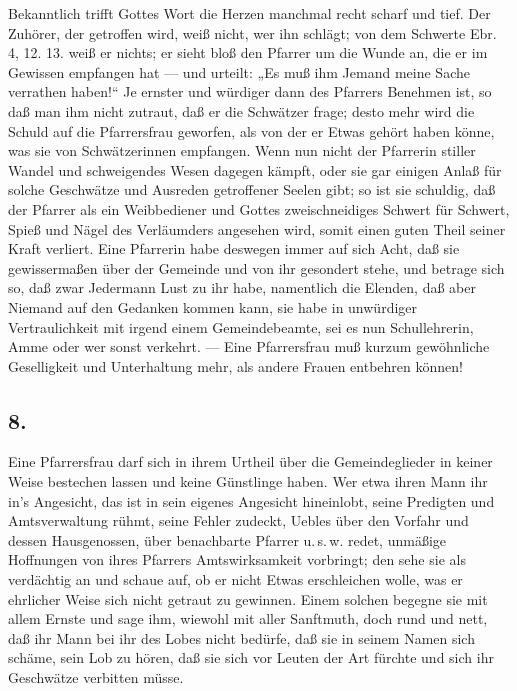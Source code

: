Bekanntlich trifft Gottes Wort die Herzen manchmal recht scharf und tief. Der Zuhörer, der getroffen wird, weiß nicht, wer ihn schlägt; von dem Schwerte Ebr. 4, 12. 13. weiß er nichts; er sieht bloß den Pfarrer um die Wunde an, die er im Gewissen empfangen hat — und urteilt: „Es muß ihm Jemand meine Sache verrathen haben!“ Je ernster und würdiger dann des Pfarrers Benehmen ist, so daß man ihm nicht zutraut, daß er die Schwätzer frage; desto mehr wird die Schuld auf die Pfarrersfrau geworfen, als von der er Etwas gehört haben könne, was sie von Schwätzerinnen empfangen. Wenn nun nicht der Pfarrerin stiller Wandel und schweigendes Wesen dagegen kämpft, oder sie gar einigen Anlaß für solche Geschwätze und Ausreden getroffener Seelen gibt; so ist sie schuldig, daß der Pfarrer als ein Weibbediener und Gottes zweischneidiges
Schwert für Schwert, Spieß und Nägel des Verläumders angesehen wird, somit einen guten Theil seiner Kraft verliert. Eine Pfarrerin habe deswegen immer auf sich Acht, daß sie gewissermaßen über der Gemeinde und von ihr gesondert stehe, und betrage sich so, daß zwar Jedermann Lust zu ihr habe, namentlich die Elenden, daß aber Niemand auf den Gedanken kommen kann, sie habe in unwürdiger Vertraulichkeit mit irgend einem Gemeindebeamte, sei es nun Schullehrerin, Amme oder wer sonst verkehrt. — Eine Pfarrersfrau muß kurzum gewöhnliche Geselligkeit und Unterhaltung mehr, als andere Frauen entbehren können!

\subsection{8.}

Eine Pfarrersfrau darf sich in ihrem Urtheil über die Gemeindeglieder in keiner Weise bestechen lassen und keine Günstlinge haben. Wer etwa ihren Mann ihr in’s Angesicht, das ist in sein eigenes Angesicht hineinlobt, seine Predigten und Amtsverwaltung rühmt, seine Fehler zudeckt, Uebles über den Vorfahr und dessen Hausgenossen, über benachbarte Pfarrer u.\,s.\,w. redet, unmäßige Hoffnungen von ihres Pfarrers Amtswirksamkeit vorbringt; den sehe sie als verdächtig an und schaue auf, ob er nicht Etwas erschleichen wolle, was er ehrlicher Weise sich nicht getraut zu gewinnen. Einem solchen begegne sie mit allem Ernste und sage ihm, wiewohl mit aller Sanftmuth, doch rund und nett, daß ihr Mann bei ihr des Lobes nicht bedürfe, daß sie in seinem Namen sich schäme, sein Lob zu hören, daß sie sich vor Leuten der Art fürchte und sich ihr Geschwätze verbitten müsse.

